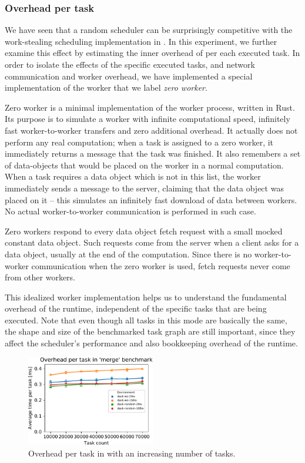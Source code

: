 \subsubsection*{Overhead per task}
\label{sec:dask-overhead-per-task}
We have seen that a random scheduler can be surprisingly competitive with the work-stealing
scheduling implementation in \dask{}. In this experiment, we further examine
this effect by estimating the inner overhead of \dask{} per each executed task.
In order to isolate the effects of the specific executed tasks, and network communication and
worker overhead, we have implemented a special implementation of the \dask{}
worker that we label \emph{zero worker}.

Zero worker is a minimal implementation of the \dask{} worker process, written
in Rust. Its purpose is to simulate a worker with infinite computational speed, infinitely fast
worker-to-worker transfers and zero additional overhead. It actually does not perform any real
computation; when a task is assigned to a zero worker, it immediately returns a message that the
task was finished. It also remembers a set of data-objects that would be placed on the worker in a
normal computation. When a task requires a data object which is not in this list, the worker
immediately sends a message to the server, claiming that the data object was placed on it -- this
simulates an infinitely fast download of data between workers. No actual worker-to-worker
communication is performed in such case.

Zero workers respond to every data object fetch request with a small mocked constant data object.
Such requests come from the server when a client asks for a data object, usually at the end of the
computation. Since there is no worker-to-worker communication when the zero worker is used, fetch
requests never come from other workers.

This idealized worker implementation helps us to understand the fundamental overhead of the
\dask{} runtime, independent of the specific tasks that are being executed.
Note that even though all tasks in this mode are basically the same, the shape and size of the
benchmarked task graph are still important, since they affect the scheduler's performance and also
bookkeeping overhead of the runtime.

\begin{figure}
	\centering
	\includegraphics[width=0.5\textwidth]{imgs/rsds/charts/dask-merge-task-scaling}
	\caption{Overhead per task in \dask{} with an increasing number of tasks.}
	\label{fig:dask-merge-task-scaling}
\end{figure}

